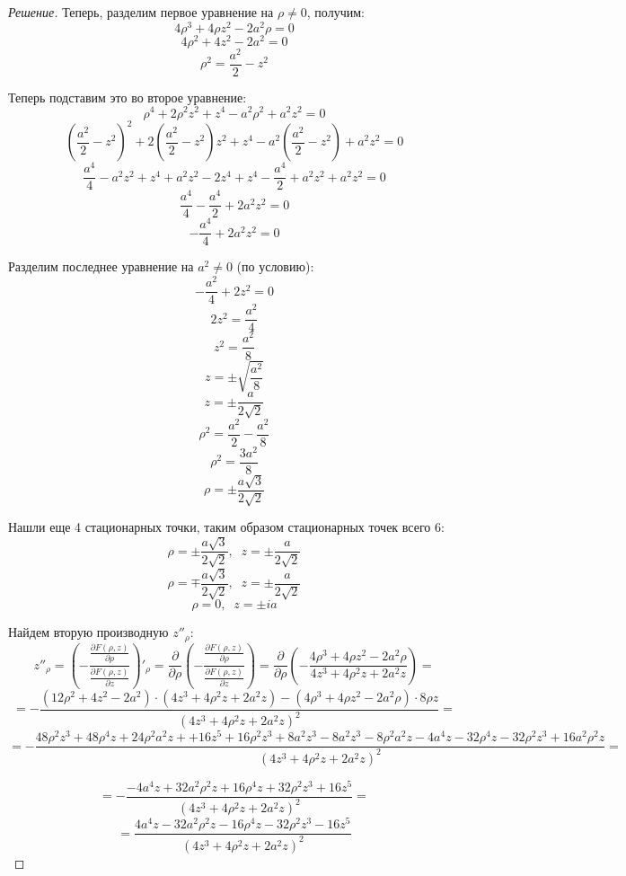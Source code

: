 \documentclass{article}
\begin{document}
\begin{proof}[Решение]
	Теперь, разделим первое уравнение на $\rho \not = 0$, получим:
	$$4\rho^3 + 4\rho z^2 -2a^2\rho = 0$$
	$$4\rho^2 + 4z^2 -2a^2= 0$$
	$$\rho^2 = \frac{a^2}{2} - z^2$$
	
	Теперь подставим это во второе уравнение:
	$$\rho^4 + 2\rho^2z^2 + z^4 - a^2\rho^2 + a^2z^2 = 0$$
	$$\left(\frac{a^2}{2} - z^2\right)^2 + 2\left(\frac{a^2}{2} - z^2\right)z^2 + z^4 - a^2\left(\frac{a^2}{2} - z^2\right) + a^2z^2 = 0$$
	$$\frac{a^4}{4} - a^2z^2 + z^4 + a^2z^2 - 2z^4 + z^4 - \frac{a^4}{2} + a^2z^2 + a^2z^2=0$$
	$$\frac{a^4}{4} - \frac{a^4}{2} + 2a^2z^2 = 0$$
	$$-\frac{a^4}{4}+2a^2z^2 = 0$$
	
	Разделим последнее уравнение на $a^2 \not = 0$ (по условию):
	$$-\frac{a^2}{4}+2z^2 = 0$$
	$$2z^2 = \frac{a^2}{4}$$
	$$z^2 = \frac{a^2}{8}$$
	$$z = \pm \sqrt{\frac{a^2}{8}}$$
	$$z = \pm \frac{a}{2\sqrt{2}}$$
	$$\rho^2 = \frac{a^2}{2} - \frac{a^2}{8}$$
	$$\rho^2 = \frac{3a^2}{8}$$
	$$\rho = \pm \frac{a\sqrt{3}}{2\sqrt{2}}$$
	
	Нашли еще 4 стационарных точки, таким образом стационарных точек всего 6:
	$$\rho = \pm \frac{a\sqrt{3}}{2\sqrt{2}} , \;\; z = \pm \frac{a}{2\sqrt{2}}$$
	$$\rho = ∓ \frac{a\sqrt{3}}{2\sqrt{2}} , \;\; z = \pm \frac{a}{2\sqrt{2}}$$
	$$\rho = 0, \;\; z = \pm ia$$
	
	Найдем вторую производную $z''_\rho$:
	$$z''_\rho = \left(-\dfrac{\frac{\partial F(\rho, z)}{\partial \rho} }{\frac{\partial F(\rho, z)}{\partial z}}\right)'_\rho = 
	\frac{\partial}{\partial \rho}\left(-\dfrac{\frac{\partial F(\rho, z)}{\partial \rho} }{\frac{\partial F(\rho, z)}{\partial z}}\right) = 
	\frac{\partial}{\partial \rho}\left(-\dfrac{4\rho^3 + 4\rho z^2 -2a^2\rho}{4z^3 + 4\rho^2 z +2a^2z}\right) = $$
	$$ = - \dfrac{
		(12\rho^2 +  4z^2 - 2a^2) \cdot (4z^3 + 4\rho^2 z + 2a^2 z) - (4\rho^3 + 4\rho z^2 -2a^2\rho) \cdot 8 \rho z
	}
	{
		(4z^3 + 4\rho^2 z +2a^2z)^2
	} =$$
	$$ = - \dfrac{
		48 \rho^2 z^3 + 48 \rho^4 z + 24 \rho^2 a^2 z +
		+ 16z^5 + 16 \rho^2 z^3 + 8a^2 z^3
		- 8a^2z^3 - 8\rho^2 a^2 z - 4a^4z
		 - 32\rho^4 z - 32 \rho^2 z^3 + 16 a^2\rho^2 z
	}
	{
		(4z^3 + 4\rho^2 z +2a^2z)^2
	} = $$

$$ = - \dfrac{
	-4a^4z + 32a^2 \rho^2 z + 16 \rho^4 z + 32 \rho^2 z^3 + 16z^5
}
{
	(4z^3 + 4\rho^2 z +2a^2z)^2
}= $$
$$ = \dfrac{
	4a^4z - 32a^2 \rho^2 z - 16 \rho^4 z - 32 \rho^2 z^3 - 16z^5
}
{
	(4z^3 + 4\rho^2 z +2a^2z)^2
}$$



\end{proof}
\end{document}
